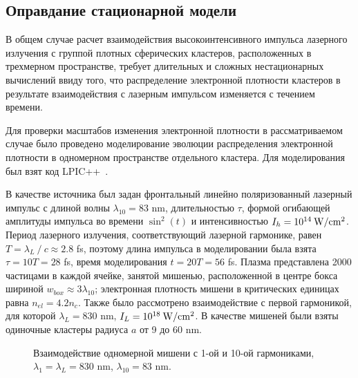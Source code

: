 \subsection{Оправдание стационарной модели}

В общем случае расчет взаимодействия высокоинтенсивного импульса лазерного излучения с группой плотных сферических кластеров, расположенных в трехмерном пространстве, требует длительных и сложных нестационарных вычислений ввиду того, что распределение электронной плотности кластеров в результате взаимодействия с лазерным импульсом изменяется с течением времени.

Для проверки масштабов изменения электронной плотности в рассматриваемом случае было проведено моделирование эволюции распределения электронной плотности в одномерном пространстве отдельного кластера. Для моделирования был взят код LPIC++~\cite{Pfund1998}.

В качестве источника был задан фронтальный линейно поляризованный лазерный импульс с длиной волны $\lambda_{10} = 83$ nm, длительностью $\tau$, формой огибающей амплитуды импульса во времени $\sin^2{(t)}$ и интенсивностью $I_{h} = 10^{14}\:\rm{W}/\rm{cm}^2$. Период лазерного излучения, соответствующий лазерной гармонике, равен $T = \lambda_{L}\:/\:c \approx 2.8$ fs, поэтому длина импульса в моделировании была взята $\tau = 10T = 28$ fs, время моделирования $t = 20T = 56$ fs. Плазма представлена 2000 частицами в каждой ячейке, занятой мишенью, расположенной в центре бокса шириной $w_{box} \approx 3\lambda_{10}$; электронная плотность мишени в критических единицах равна $n_{el} = 4.2 n_c$. Также было рассмотрено взаимодействие с первой гармоникой, для которой $\lambda_L = 830$ nm, $I_L = 10^{18}\:\rm{W}/\rm{cm}^2$. В качестве мишеней были взяты одиночные кластеры радиуса $a$ от 9 до 60 nm.




    \begin{figure}[H]
        \hfil
        \caption{Взаимодействие одномерной мишени с 1-ой и 10-ой гармониками, $\lambda_{1} = \lambda_{L} = 830$ nm, $\lambda_{10} = 83$ nm.}\label{lpic_low_high:image}
    \end{figure}

